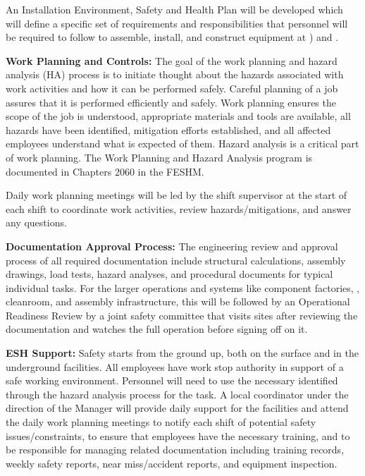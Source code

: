  An Installation Environment, Safety and Health Plan will be developed which will define a specific set of  requirements and responsibilities that personnel will be required to follow to assemble, install, and construct equipment at ) and . 

{\bf Work Planning and Controls:} The goal of the work planning and hazard analysis (HA) process is to initiate thought about the hazards associated with work activities and how it can be performed safely. Careful planning of a job assures that it is performed efficiently and safely. Work planning ensures the scope of the job is understood, appropriate materials and tools are available, all hazards have been identified, mitigation efforts established, and all affected employees understand what is expected of them. Hazard analysis is a critical part of work planning.  The Work Planning and Hazard Analysis program is documented in Chapters 2060 in the FESHM.

Daily work planning meetings will be led by the shift supervisor at the start of each shift to coordinate work activities, review hazards/mitigations, and answer any questions.

{\bf Documentation Approval Process:} The engineering review and approval process of all required documentation include structural calculations, assembly drawings, load tests, hazard analyses, and procedural documents for typical individual tasks.  For the larger operations and systems like  component factories, , cleanroom, and assembly infrastructure, this will be followed by an Operational Readiness Review by a joint safety committee that visits sites after reviewing the documentation and watches the full operation before signing off on it.

{\bf ESH Support:} Safety starts from the ground up, both on the surface and in the underground facilities. All employees have work stop authority in support of  a safe working environment. Personnel will need to use the necessary  identified through the hazard analysis process for the task. A local  coordinator under the direction of the   Manager will provide daily support for the facilities and attend the daily work planning meetings to notify each shift of potential safety issues/constraints, to ensure that  employees have the necessary  training, and to be responsible for managing  related  documentation including training records, weekly safety reports, near miss/accident reports, and equipment inspection.

